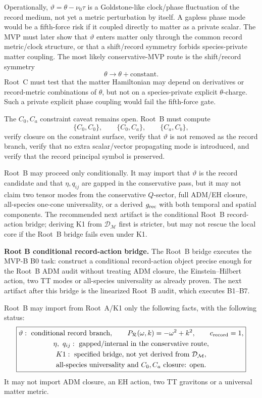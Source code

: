 \documentclass[11pt]{article}
\begin{document}
Operationally, \(\vartheta=\theta-\nu_0\tau\) is a Goldstone-like
clock/phase fluctuation of the record medium, not yet a metric perturbation by
itself.  A gapless phase mode would be a fifth-force risk if it coupled
directly to matter as a private scalar.  The MVP must later show that
\(\vartheta\) enters matter only through the common record metric/clock
structure, or that a shift/record symmetry forbids species-private matter
coupling.
The most likely conservative-MVP route is the shift/record symmetry
\[
\boxed{\theta\to\theta+\text{constant}.}
\]
Root~C must test that the matter Hamiltonian may depend on derivatives or
record-metric combinations of \(\theta\), but not on a species-private explicit
\(\theta\)-charge.  Such a private explicit phase coupling would fail the
fifth-force gate.

The \(C_0,C_a\) constraint caveat remains open.  Root~B must compute
\[
\boxed{
\{C_0,C_0\},\qquad \{C_0,C_a\},\qquad \{C_a,C_b\},
}
\]
verify closure on the constraint surface, verify that \(\vartheta\) is not
removed as the record branch, verify that no extra scalar/vector propagating
mode is introduced, and verify that the record principal symbol is preserved.

Root~B may proceed only conditionally.  It may import that \(\vartheta\) is the
record candidate and that \(\eta,q_{ij}\) are gapped in the conservative pass,
but it may not claim two tensor modes from the conservative \(Q\)-sector, full
ADM/EH closure, all-species one-cone universality, or a derived
\(g_{\rm rec}\) with both temporal and spatial components.  The recommended
next artifact is the conditional Root~B record-action bridge; deriving K1 from
\(\mathcal D_{\mathcal M}\) first is stricter, but may not rescue the local
core if the Root~B bridge fails even under K1.

\medskip\noindent\textbf{Root B conditional record-action bridge.}
The Root~B bridge executes the MVP-B B0 task: construct a conditional
record-action object precise enough for the Root~B ADM audit without treating
ADM closure, the Einstein--Hilbert action, two TT modes or all-species
universality as already proven.  The next artifact after this bridge is the
linearized Root~B audit, which executes B1--B7.

Root~B may import from Root~A/K1 only the following facts, with the following
status:
\[
\boxed{
\begin{gathered}
\vartheta:\ \text{conditional record branch},\qquad
P_{\mathcal R}(\omega,k)=-\omega^2+k^2,\qquad
c_{\rm record}=1,\\
\eta,\ q_{ij}:\ \text{gapped/internal in the conservative route},\\
K1:\ \text{specified bridge, not yet derived from }\mathcal D_{\mathcal M},\\
\text{all-species universality and }C_0,C_a\text{ closure: open.}
\end{gathered}
}
\]
It may not import ADM closure, an EH action, two TT gravitons or a universal
matter metric.
\end{document}
